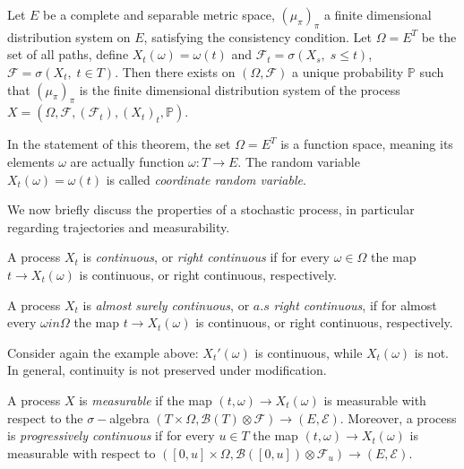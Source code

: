 \begin{theorem}
    Let $E$ be a complete and separable metric space, $(\mu_{\pi})_{\pi}$ a finite dimensional distribution system on $E$, satisfying the consistency condition. Let $\Omega = E^T$ be the set of all paths, define $X_t(\omega) = \omega(t)$ and $\mathcal{F}_t = \sigma(X_s, \; s\leq t)$, $\mathcal{F} = \sigma(X_t, \; t \in T)$. Then there exists on $(\Omega, \mathcal{F})$ a unique probability $\mathbb{P}$ such that $(\mu_{\pi})_{\pi}$ is the finite dimensional distribution system of the process $X = (\Omega, \mathcal{F}, (\mathcal{F}_t), (X_t)_t, \mathbb{P})$. 
\end{theorem}

In the statement of this theorem, the set $\Omega = E^T$ is a function space, meaning its elements $\omega$ are actually function $\omega : T \to E$. The random variable $X_t(\omega) = \omega(t)$ is called \textit{coordinate random variable}. 

We now briefly discuss the properties of a stochastic process, in particular regarding trajectories and measurability. 

\begin{definition}
    A process $X_t$ is \textit{continuous}, or \textit{right continuous} if for every $\omega \in \Omega$ the map $t \to X_t(\omega)$ is continuous, or right continuous, respectively.
\end{definition}
\begin{definition}
    A process $X_t$ is \textit{almost surely continuous}, or $a.s$ \textit{right continuous}, if for almost every $\omega in \Omega$ the map $t \to X_t(\omega)$ is continuous, or right continuous, respectively. 
\end{definition}


Consider again the example above: $X_t'(\omega)$ is continuous, while $X_t(\omega)$ is not. In general, continuity is not preserved under modification. 

\begin{definition}
    A process $X$ is \textit{measurable} if the map $(t,\omega) \to X_t(\omega)$ is measurable with respect to the $\sigma-$algebra $(T\times \Omega,\mathcal{B}(T) \otimes \mathcal{F}) \to (E,\mathcal{E})$. Moreover, a process is \textit{progressively continuous} if  for every $u \in T$ the map $(t,\omega) \to X_t(\omega)$ is measurable with respect to $([0,u] \times \Omega, \mathcal{B}([0,u]) \otimes \mathcal{F}_u) \to (E,\mathcal{E})$. 
\end{definition}

